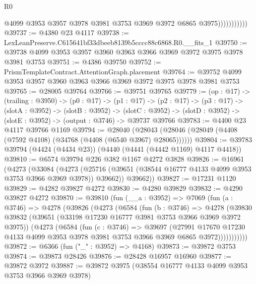 \begin{lexlean}{R0}
\begin{coremodule}
                          @4099
                          @3953
                          @3957
                          @3978
                          @3981
                          @3753
                          @3969
                          @3972
                          @6865
                          @3975)))))))))))
@39737 := @4380 @23 @4117
@39738 := LexLeanPreserve.C615641bf33dbeeb8139b5cccc88c6868.R0.__fits_1
@39750 := @39738 @4099 @3953 @3957 @3960 @3963 @3966 @3969 @3972 @3975 @3978 @3981 @3753
@39751 := @4386 @39750
@39752 := PrismTemplateContract.AttentionGraph.placement
@39764 := @39752 @4099 @3953 @3957 @3960 @3963 @3966 @3969 @3972 @3975 @3978 @3981 @3753
@39765 := @28005 @39764
@39766 := @39751 @39765
@39779 := (op : @17) ->
  (trailing : @3950) ->
  (p0 : @17) ->
  (p1 : @17) ->
  (p2 : @17) ->
  (p3 : @17) ->
  (slotA : @3952) ->
  (slotB : @3952) ->
  (slotC : @3952) -> (slotD : @3952) -> (slotE : @3952) -> (output : @3746) -> @39737 @39766
@39783 := @4400 @23 @4117 @39766 @1169
@39794 := @28040
    (@28043 (@28046 (@28049 (@4408 (@7592 @4108) (@34768 (@4408 (@6540 @3967) @28065))))))
@39804 := @39783 @39794 (@4424 (@4434 @23)) (@4440 (@4441 (@4442 @1169) @4117 @4418))
@39810 := @6574 @39794 @226 @382 @1167 @4272 @3828
@39826 := @16961
    (@4273
      (@33084
        (@4273 (@25716 (@39651 (@38544 @16777 @4133 @4099 @3953 @3753 @3966 @3969 @3978)) @39662))
        @39662))
@39827 := @17231 @1120
@39829 := @4282 @39827 @4272
@39830 := @4280 @39829
@39832 := @4290 @39827 @4272
@39870 := @39810
    (fun (__a : @3952) =>
    @7069
      (fun (a : @3746) =>
      @4278
        (@39826
          (@4273
            (@6584
              (fun (b : @3746) =>
              @4278
                (@39830
                  @39832
                  (@39651 (@33198 @17230 @16777 @3981 @3753 @3966 @3969 @3972 @3975))
                  (@4273
                    (@6584
                      (fun (c : @3746) =>
                      @39697
                        (@27991
                          @17670
                          @17230
                          @4133
                          @4099
                          @3953
                          @3978
                          @3981
                          @3753
                          @3966
                          @3969
                          @6865
                          @3972)))))))))))
@39872 := @6366 (fun ("_" : @3952) => @4168)
@39873 := @39872 @3753
@39874 := @39873 @28426
@39876 := @28428 @16957 @16960
@39877 := @39872 @3972
@39887 := @39872 @3975 (@38554 @16777 @4133 @4099 @3953 @3753 @3966 @3969 @3978)

\end{coremodule}
\end{lexlean}
